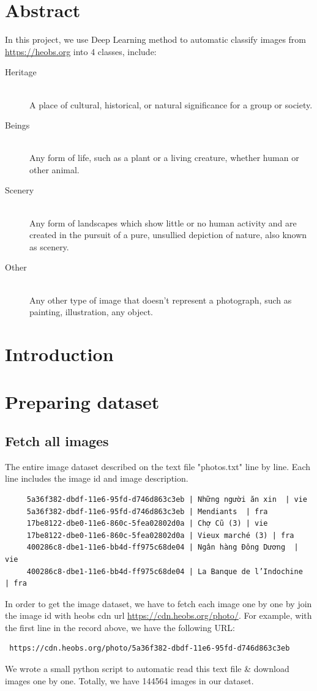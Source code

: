\documentclass[11pt]{article}
\begin{document}
\section*{Abstract}
In this project, we use Deep Learning method to automatic classify images from \href{https://heobs.org}{https://heobs.org} into 4 classes, include:
\begin{description}
\item[Heritage] \hfill \\ A place of cultural, historical, or natural significance for a group or society.
\item[Beings] \hfill \\ Any form of life, such as a plant or a living creature, whether human or other animal.
\item[Scenery] \hfill \\ Any form of landscapes which show little or no human activity and are created in the pursuit of a pure, unsullied depiction of nature, also known as scenery.
\item[Other] \hfill \\ Any other type of image that doesn't represent a photograph, such as painting, illustration, any object.	
\end{description}

\section{Introduction}
\section{Preparing dataset}
\subsection{Fetch all images}
The entire image dataset described on the text file "photos.txt" line by line. Each line includes the image id and image description. 
\begin{verbatim}
	 5a36f382-dbdf-11e6-95fd-d746d863c3eb | Những người ăn xin  | vie
	 5a36f382-dbdf-11e6-95fd-d746d863c3eb | Mendiants  | fra
	 17be8122-dbe0-11e6-860c-5fea02802d0a | Chợ Cũ (3) | vie
	 17be8122-dbe0-11e6-860c-5fea02802d0a | Vieux marché (3) | fra
	 400286c8-dbe1-11e6-bb4d-ff975c68de04 | Ngân hàng Đông Dương  | vie
	 400286c8-dbe1-11e6-bb4d-ff975c68de04 | La Banque de l’Indochine  | fra
\end{verbatim}
In order to get the image dataset, we have to fetch each image one by one by join the image id with heobs cdn url \href{https://cdn.heobs.org/photo/}{https://cdn.heobs.org/photo/}. For example, with the first line in the record above, we have the following URL: 
\begin{verbatim}
 https://cdn.heobs.org/photo/5a36f382-dbdf-11e6-95fd-d746d863c3eb
\end{verbatim}
We wrote a small python script to automatic read this text file \& download images one by one.
Totally, we have 144564 images in our dataset.
\end{document}
